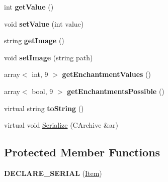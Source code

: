 \begin{DoxyCompactItemize}
\hypertarget{class_item_a9ceb9a0df0efe18d23e347471f908be7}{}\label{class_item_a9ceb9a0df0efe18d23e347471f908be7} 
int {\bfseries get\+Value} ()
\item 
\hypertarget{class_item_adaa9513af7a2f17488c5e7317d2b8e08}{}\label{class_item_adaa9513af7a2f17488c5e7317d2b8e08} 
void {\bfseries set\+Value} (int value)
\item 
\hypertarget{class_item_abafe93fe7bf198b5c208e095fca704b4}{}\label{class_item_abafe93fe7bf198b5c208e095fca704b4} 
string {\bfseries get\+Image} ()
\item 
\hypertarget{class_item_ab2e28b59d2374b114cd4baa60fb9dd2a}{}\label{class_item_ab2e28b59d2374b114cd4baa60fb9dd2a} 
void {\bfseries set\+Image} (string path)
\item 
\hypertarget{class_item_aeb68ae1ad1733a66ca3fc85b13a86f82}{}\label{class_item_aeb68ae1ad1733a66ca3fc85b13a86f82} 
array$<$ int, 9 $>$ {\bfseries get\+Enchantment\+Values} ()
\item 
\hypertarget{class_item_af4bea219b51babc0cee62a949a79a46d}{}\label{class_item_af4bea219b51babc0cee62a949a79a46d} 
array$<$ bool, 9 $>$ {\bfseries get\+Enchantments\+Possible} ()
\item 
\hypertarget{class_item_a916034b979ec9c4356a062a197fc2af7}{}\label{class_item_a916034b979ec9c4356a062a197fc2af7} 
virtual string {\bfseries to\+String} ()
\item 
virtual void \hyperlink{class_item_ad1eae21e57fc3ce3252080a4efbfb8e8}{Serialize} (C\+Archive \&ar)
\end{DoxyCompactItemize}
\subsection*{Protected Member Functions}
\begin{DoxyCompactItemize}
\item 
\hypertarget{class_item_aceed71a49985945d19f9a11380f27036}{}\label{class_item_aceed71a49985945d19f9a11380f27036} 
{\bfseries D\+E\+C\+L\+A\+R\+E\+\_\+\+S\+E\+R\+I\+AL} (\hyperlink{class_item}{Item})
\end{DoxyCompactItemize}
